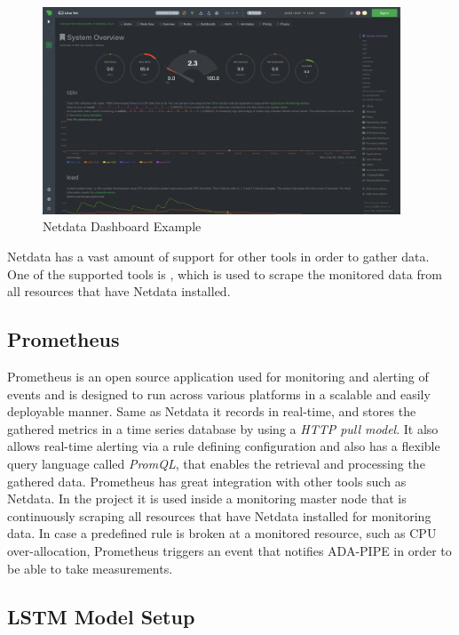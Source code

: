     \begin{figure}[h!]
        \centering
        \includegraphics[width=0.95\textwidth]{figures/netdata.png}
        \caption{Netdata Dashboard Example}
        \label{fig:netdata-dashboard}
    \end{figure}
    Netdata has a vast amount of support for other tools in order to gather data. 
    One of the supported tools is , which is used to scrape the monitored data from all resources that have Netdata installed.

  \subsection{Prometheus}
  \label{sec:prometheus-evaluation}
  
    Prometheus is an open source application used for monitoring and alerting of events and is designed to run across various platforms in a scalable and easily deployable manner.
    Same as Netdata it records in real-time, and stores the gathered metrics in a time series database by using a \emph{HTTP pull model}. It also allows real-time alerting via a rule defining configuration and also has a flexible query language called \emph{PromQL}, that enables the retrieval and processing the gathered data. Prometheus has great integration with other tools such as Netdata.
    In the project it is used inside a monitoring master node that is continuously scraping all resources that have Netdata installed for monitoring data. In case a predefined rule is broken at a monitored resource, such as CPU over-allocation, Prometheus triggers an event that notifies ADA-PIPE in order to be able to take measurements.

  \subsection{LSTM Model Setup}
